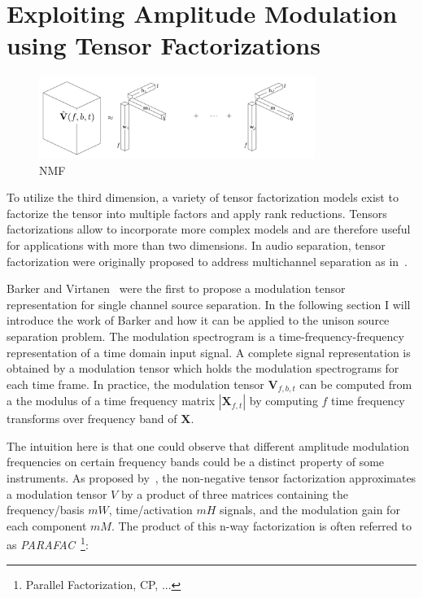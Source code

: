 \section{Exploiting Amplitude Modulation using Tensor Factorizations}
\label{sub:am}


\begin{figure}
  \centering
  \includegraphics[width=0.8\textwidth]{Chapters/06_Separation_Unknown/figures/cpd.pdf}
  \caption{NMF }
  \label{fig:cpd}
\end{figure}

To utilize the third dimension, a variety of tensor factorization models exist to factorize the tensor into multiple factors and apply rank reductions.
Tensors factorizations allow to incorporate more complex models and are therefore useful for applications with more than two dimensions.
In audio separation, tensor factorization were originally proposed to address multichannel separation as in~\cite{fitzgerald08, fevotte10, ozerov11}. 
\par
Barker and Virtanen~\cite{barker13} were the first to propose a modulation tensor representation for single channel source separation. 
In the following section I will introduce the work of Barker and how it can be applied to the unison source separation problem.
The modulation spectrogram is a time-frequency-frequency representation of a time domain input signal.
A complete signal representation is obtained by a modulation tensor which holds the modulation spectrograms for each time frame.
In practice, the modulation tensor \(\mathbf{V}_{f, b, t}\) can be computed from a the modulus of a time frequency matrix \(| \mathbf{X}_{f, t} |\) by computing \(f\) time frequency transforms over frequency band of \(\mathbf{X}\).
\par
The intuition here is that one could observe that different amplitude modulation frequencies on certain frequency bands could be a distinct property of some instruments.
As proposed by~\cite{barker13}, the non-negative tensor factorization approximates a modulation tensor \(V\) by a product of three matrices containing the frequency/basis \(mW\), time/activation \(mH\) signals, and the modulation gain for each component \(mM\).
The product of this n-way factorization is often referred to as \emph{PARAFAC}~\footnote{Parallel Factorization, CP, ...}:

